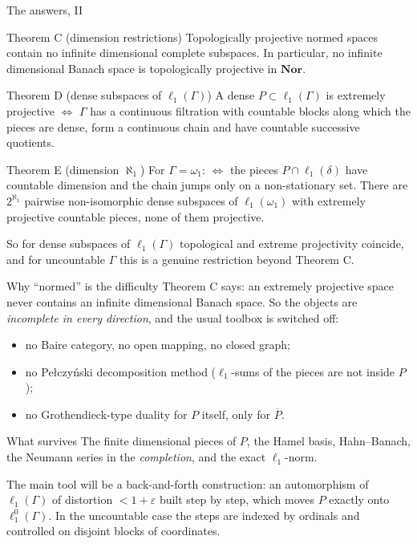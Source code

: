 \documentclass[10pt,aspectratio=169]{beamer}
\newcommand{\Nor}{\mathbf{Nor}}
\newcommand{\lo}[1]{\ell_1^0(#1)}
\newcommand{\ellone}[1]{\ell_1(#1)}
\begin{document}
\begin{frame}{The answers, II}
  \begin{block}{Theorem C (dimension restrictions)}
    Topologically projective normed spaces contain no infinite dimensional
    complete subspaces. In particular, no infinite dimensional Banach space is
    topologically projective in $\Nor$.
  \end{block}
  \begin{block}{Theorem D (dense subspaces of $\ellone\Gamma$)}
    A dense $P\subset\ellone\Gamma$ is extremely projective $\iff$ $\Gamma$ has a
    continuous filtration with countable blocks along which the pieces are
    dense, form a continuous chain and have countable successive quotients.
  \end{block}
  \begin{block}{Theorem E (dimension $\aleph_1$)}
    For $\Gamma=\omega_1$: $\iff$ the pieces $P\cap\ellone\delta$ have countable
    dimension and the chain jumps only on a non-stationary set. There are
    $2^{\aleph_1}$ pairwise non-isomorphic dense subspaces of $\ellone{\omega_1}$
    with extremely projective countable pieces, none of them projective.
  \end{block}
  So for dense subspaces of $\ellone\Gamma$ topological and extreme
  projectivity coincide, and for uncountable $\Gamma$ this is a genuine
  restriction beyond Theorem C.
\end{frame}

\begin{frame}{Why ``normed'' is the difficulty}
  Theorem C says: an extremely projective space never contains an infinite
  dimensional Banach space. So the objects are \emph{incomplete in every
  direction}, and the usual toolbox is switched off:
  \begin{itemize}
    \item no Baire category, no open mapping, no closed graph;
    \item no Pe{\l}czy\'nski decomposition method ($\ell_1$-sums of the pieces
      are not inside $P$);
    \item no Grothendieck-type duality for $P$ itself, only for $\overline P$.
  \end{itemize}
  \medskip
  \begin{alertblock}{What survives}
    The finite dimensional pieces of $P$, the Hamel basis, Hahn--Banach, the
    Neumann series in the \emph{completion}, and the exact $\ell_1$-norm.
  \end{alertblock}
  \medskip
  The main tool will be a \alert{back-and-forth construction}: an automorphism of
  $\ellone\Gamma$ of distortion $<1+\varepsilon$ built step by step, which moves
  $P$ exactly onto $\lo\Gamma$. In the uncountable case the steps are indexed by
  ordinals and controlled on disjoint blocks of coordinates.
\end{frame}
\end{document}
